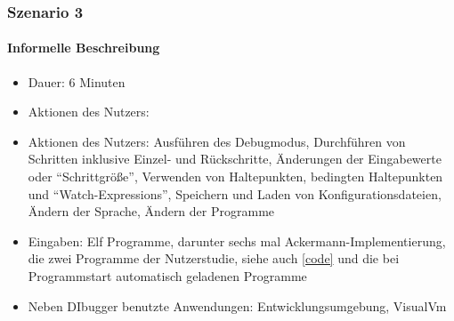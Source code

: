 \documentclass[parskip=full]{scrartcl}
\begin{document}
    \subsubsection{Szenario 3}
        \paragraph{Informelle Beschreibung}
        \begin{itemize}
            \item{Dauer:} 6 Minuten 
            \item{Aktionen des Nutzers:}  
            \item{Aktionen des Nutzers:} Ausführen des Debugmodus, Durchführen von Schritten inklusive Einzel- und Rückschritte, Änderungen der Eingabewerte oder \enquote{Schrittgröße}, Verwenden von Haltepunkten, bedingten Haltepunkten und \enquote{Watch-Expressions}, Speichern und Laden von Konfigurationsdateien, Ändern der Sprache, Ändern der Programme
            \item{Eingaben:} Elf Programme, darunter sechs mal Ackermann-Implementierung, die zwei Programme der Nutzerstudie, siehe auch \ref{code} und die bei Programmstart automatisch geladenen Programme
            \item{Neben DIbugger benutzte Anwendungen:} Entwicklungsumgebung, VisualVm
        \end{itemize}
\end{document}
